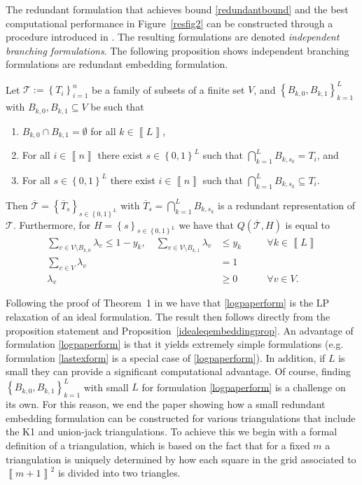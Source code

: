 \documentclass[mnsc]{informs3}
\newcommand{\set}[1]{\left\{#1\right\}}                     %
\newcommand{\bra}[1]{\left(#1\right)}
\newcommand{\sidx}[1]{\left\llbracket     #1 \right\rrbracket}
\begin{document}
The redundant formulation that achieves bound \eqref{redundantbound} and the best computational performance in Figure~\ref{resfig2}  can be constructed through a procedure introduced in \cite{Modeling-Disjunctive-Constraints-FULL}. The resulting formulations are denoted \emph{independent branching formulations}. The following proposition shows independent branching formulations are redundant embedding formulation. 
\begin{proposition}\label{indepbranchprop}
Let $\mathcal{T}:=\set{T_i}_{i=1}^n$ be a family of subsets of a finite set $V$, and $\set{B_{k,0},B_{k,1}}_{k=1}^L$ with $B_{k,0},B_{k,1}\subseteq V$ be such that 
\begin{enumerate}
\item $B_{k,0}\cap B_{k,1}=\emptyset$ for all $k\in\sidx{L}$,
\item For all $i\in \sidx{n}$ there exist $s\in \set{0,1}^L$ such that $\bigcap_{k=1}^L B_{k,s_k}=T_i$, and
\item For all $s\in \set{0,1}^L$ there exist $i\in \sidx{n}$ such that $\bigcap_{k=1}^L B_{k,s_k}\subseteq T_i$.
\end{enumerate}
Then $\overline{\mathcal{T}}=\set{\overline{T}_s}_{s\in\set{0,1}^L}$ with $\overline{T}_s=\bigcap_{k=1}^L B_{k,s_k}$ is a redundant representation of $\mathcal{T}$. Furthermore, for $H=\set{s}_{s\in\set{0,1}^L}$ we have that $Q\bra{\overline{\mathcal{T}},H}$ is equal to 
 \begin{subequations}\label{logpaperform}
 \begin{alignat}{3}
 \sum\nolimits_{v\in V\setminus B_{k,0}} \lambda_v \leq 1-y_k,\quad
 \sum\nolimits_{v\in V\setminus B_{k,1}} \lambda_v &\leq y_k&\quad& \forall k\in \sidx{L}\\
 \sum\nolimits_{v\in V} \lambda_v &=1 \\
 \lambda_v &\geq 0 &\quad& \forall v\in V.
 \end{alignat}
 \end{subequations}
\end{proposition}
Following the proof of Theorem~1 in \cite{Modeling-Disjunctive-Constraints-FULL} we have that \eqref{logpaperform} is the LP relaxation of an ideal formulation. The result then follows directly from the proposition statement  and Proposition~\ref{idealeqembeddingprop}.
\Halmos\endproof
An advantage of formulation \eqref{logpaperform} is that it yields extremely simple formulations (e.g. formulation \eqref{lastexform} is a special case of \eqref{logpaperform}). In addition, if $L$ is small they can provide a significant computational advantage.  Of course, finding $\set{B_{k,0},B_{k,1}}_{k=1}^L$ with small $L$ for formulation \eqref{logpaperform} is a challenge on its own. For this reason, we end the paper showing how a small redundant embedding formulation can be constructed for various triangulations that include the K1 and union-jack triangulations. To achieve this we begin with a formal definition of a triangulation, which is based on the fact that for a fixed $m$ a  triangulation is uniquely determined by how each square in the grid associated to $\sidx{m+1}^2$ is divided into two triangles.
\end{document}
